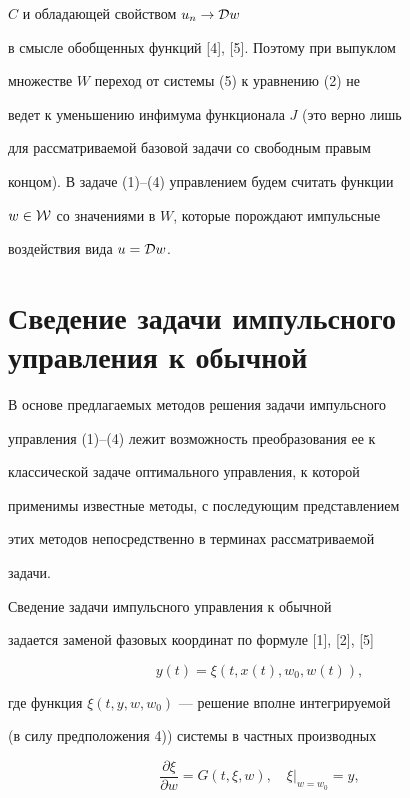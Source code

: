 $C$ и обладающей свойством $u_n \to {\cal D}w$


в смысле обобщенных функций [4], [5]. Поэтому при выпуклом 


множестве $W$ переход от системы (5) к уравнению (2) не


ведет к уменьшению инфимума функционала $J$ (это верно лишь


для рассматриваемой базовой задачи со свободным правым 


концом). В задаче (1)--(4) управлением будем считать функции


$w\in {\cal W}$ со значениями в $W$, которые порождают импульсные


воздействия вида $u={\cal D} w$.





\section{Сведение задачи импульсного управления к обычной}





В основе предлагаемых методов решения задачи импульсного 


управления (1)--(4) лежит возможность преобразования ее к


классической задаче оптимального управления, к которой


применимы известные методы, с последующим представлением


этих методов непосредственно в терминах рассматриваемой


задачи.





Сведение задачи импульсного управления к обычной 


задается заменой фазовых координат по формуле [1], [2], [5]


\begin{equation}


y(t)=\xi(t,x(t),w_0,w(t)),


\end{equation}


где функция $\xi(t,y,w,w_0)$ --- решение вполне интегрируемой


(в силу предположения 4)) системы в частных производных


\begin{equation}


\frac{\partial \xi}{\partial w} = G(t, \xi,w), \quad  \xi|_{w=w_0}=y,


\end{equation}


